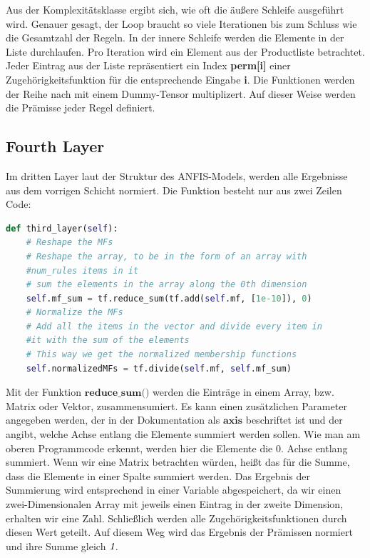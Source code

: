 Aus der Komplexitätsklasse ergibt sich, wie oft die äußere Schleife ausgeführt wird. Genauer gesagt, der Loop braucht so viele Iterationen bis zum Schluss wie die Gesamtzahl der Regeln. In der innere Schleife werden die Elemente in der Liste durchlaufen. Pro Iteration wird ein Element aus der Productliste betrachtet. Jeder Eintrag aus der Liste repräsentiert ein Index \textbf{perm{[}i{]}} einer Zugehörigkeitsfunktion für die entsprechende Eingabe \textbf{i}. Die Funktionen werden der Reihe nach mit einem Dummy-Tensor multiplizert. Auf dieser Weise werden die Prämisse jeder Regel definiert.

\subsection{Fourth Layer}\label{fourth-layer}

Im dritten Layer laut der Struktur des ANFIS-Models, werden alle Ergebnisse aus dem vorrigen Schicht normiert. Die Funktion besteht nur aus zwei Zeilen Code:
\begin{lstlisting}[language=Python]
def third_layer(self):
	# Reshape the MFs
	# Reshape the array, to be in the form of an array with 
	#num_rules items in it
	# sum the elements in the array along the 0th dimension
	self.mf_sum = tf.reduce_sum(tf.add(self.mf, [1e-10]), 0)
	# Normalize the MFs
	# Add all the items in the vector and divide every item in 
	#it with the sum of the elements
	# This way we get the normalized membership functions
	self.normalizedMFs = tf.divide(self.mf, self.mf_sum)
\end{lstlisting}

Mit der Funktion $\textbf{reduce\_sum()}$ werden die Einträge in einem Array, bzw. Matrix oder Vektor, zusammensumiert. Es kann einen zusätzlichen Parameter angegeben werden, der in der Dokumentation als $\textbf{axis}$ beschriftet ist und der angibt, welche Achse entlang die Elemente summiert werden sollen. Wie man am oberen Programmcode erkennt, werden hier die Elemente die 0. Achse entlang summiert. Wenn wir eine Matrix betrachten würden, heißt das für die Summe, dass die Elemente in einer Spalte summiert werden. Das Ergebnis der Summierung wird entsprechend in einer Variable abgespeichert, da wir einen zwei-Dimensionalen Array mit jeweils einen Eintrag in der zweite Dimension, erhalten wir eine Zahl. Schließlich werden alle Zugehörigkeitsfunktionen durch diesen Wert geteilt. Auf diesem Weg wird das Ergebnis der Prämissen normiert und ihre Summe gleich $\emph{1}$.


